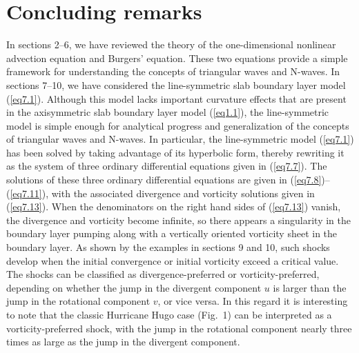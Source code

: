 \documentclass[10pt]{article}
\begin{document}
\section{Concluding remarks}          %

    In sections 2--6, we have reviewed the theory of the one-dimensional
nonlinear advection equation and Burgers' equation.  These two equations
provide a simple framework for understanding the concepts of triangular
waves and N-waves. In sections 7--10, we have considered the line-symmetric
slab boundary layer model (\ref{eq7.1}). Although this model lacks important
curvature effects that are present in the axisymmetric slab boundary layer
model (\ref{eq1.1}), the line-symmetric model is simple enough for analytical
progress and generalization of the concepts of triangular waves and N-waves.
In particular, the line-symmetric model (\ref{eq7.1}) has been solved by
taking advantage of its
hyperbolic form, thereby rewriting it as the system of three ordinary
differential equations given in (\ref{eq7.7}). The solutions of these
three ordinary differential equations are given in (\ref{eq7.8})--(\ref{eq7.11}),
with the associated divergence and vorticity solutions given in (\ref{eq7.13}).
When the denominators on the right hand sides of (\ref{eq7.13}) vanish,
the divergence and vorticity become infinite, so there appears a singularity
in the boundary layer pumping along with a vertically oriented vorticity sheet
in the boundary layer. As shown by the examples in sections 9 and 10, such shocks
develop when the initial convergence or initial vorticity exceed a critical
value. The shocks can be classified as divergence-preferred or
vorticity-preferred, depending on whether the jump in the divergent component
$u$ is larger than the jump in the rotational component $v$, or vice versa.
In this regard it is interesting to note that the classic Hurricane Hugo case
(Fig.~1) can be interpreted as a vorticity-preferred
shock, with the jump in the rotational component nearly three times as large
as the jump in the divergent component.
\end{document}
